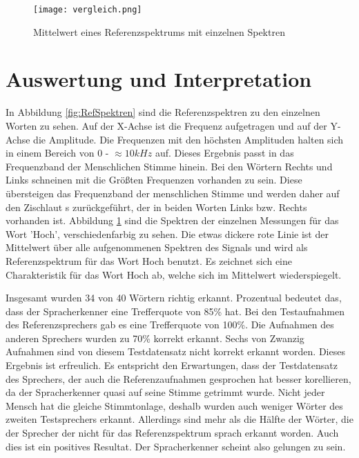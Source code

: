\begin{figure}[H]
\centering
\texttt{[image: vergleich.png]}
\caption{Mittelwert eines Referenzspektrums mit einzelnen Spektren}
\label{fig:MittelwertSpek}
\end{figure}


\section{Auswertung und Interpretation}
\label{chap:AUSWERTUNGUNDINTERPRETATION}
In Abbildung \ref{fig:RefSpektren} sind die Referenzspektren zu den einzelnen Worten zu sehen. Auf der X-Achse ist die Frequenz aufgetragen und auf der Y-Achse die Amplitude.
Die Frequenzen mit den höchsten Amplituden halten sich in einem Bereich von 0 - $\approx 10 kHz$ auf. Dieses Ergebnis passt in das Frequenzband der Menschlichen Stimme hinein. \cite{WikiMensch} Bei den Wörtern Rechts und Links schneinen mit die Größten Frequenzen vorhanden zu sein. Diese übersteigen das Frequenzband der menschlichen Stimme und werden daher auf den Zischlaut s zurückgeführt, der in beiden Worten Links bzw. Rechts vorhanden ist. 
Abbildung \ref{fig:MittelwertSpek} sind die Spektren der einzelnen Messungen für das Wort 'Hoch', verschiedenfarbig zu sehen. Die etwas dickere rote Linie ist der Mittelwert über alle aufgenommenen Spektren des Signals und wird als Referenzspektrum für das Wort Hoch benutzt. Es zeichnet sich eine Charakteristik für das Wort Hoch ab, welche sich im Mittelwert wiederspiegelt.

Insgesamt wurden 34 von 40 Wörtern richtig erkannt. Prozentual bedeutet das, dass der Spracherkenner eine Trefferquote von 85\% hat. Bei den Testaufnahmen des Referenzsprechers gab es eine Trefferquote von 100\%. Die Aufnahmen des anderen Sprechers wurden zu 70\% korrekt erkannt. Sechs von Zwanzig Aufnahmen sind von diesem Testdatensatz nicht korrekt erkannt worden. Dieses Ergebnis ist erfreulich. Es entspricht den Erwartungen, dass der Testdatensatz des Sprechers, der auch die Referenzaufnahmen gesprochen hat besser korellieren, da der Spracherkenner quasi auf seine Stimme getrimmt wurde. Nicht jeder Mensch hat die gleiche Stimmtonlage, deshalb wurden auch weniger Wörter des zweiten Testsprechers erkannt. Allerdings sind mehr als die Hälfte der Wörter, die der Sprecher der nicht für das Referenzspektrum sprach erkannt worden. Auch dies ist ein positives Resultat.  Der Spracherkenner scheint also gelungen zu sein.


